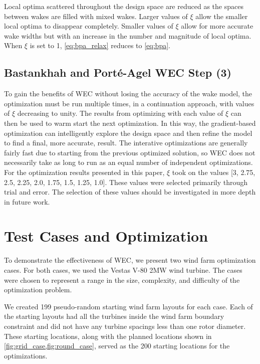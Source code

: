 \documentclass[a4paper]{jpconf}
\begin{document}
Local optima scattered throughout the design space are reduced as the spaces between wakes are filled with mixed wakes. Larger values of $\xi$ allow the smaller local optima to disappear completely. Smaller values of $\xi$ allow for more accurate wake widths but with an increase in the number and magnitude of local optima. When $\xi$ is set to 1, \cref{eq:bpa_relax} reduces to \cref{eq:bpa}.

\subsection{Bastankhah and Port\'e-Agel WEC Step (3)}
To gain the benefits of WEC without losing the accuracy of the wake model, the optimization must be run multiple times, in a continuation approach, with values of $\xi$ decreasing to unity. The results from optimizing with each value of $\xi$ can then be used to warm start the next optimization. In this way, the gradient-based optimization can intelligently explore the design space and then refine the model to find a final, more accurate, result. The interative optimizations are generally fairly fast due to starting from the previous optimized solution, so WEC does not necessarily take as long to run as an equal number of independent optimizations. For the optimization results presented in this paper, $\xi$ took on the values [3, 2.75, 2.5, 2.25, 2.0, 1.75, 1.5, 1.25, 1.0]. These values were selected primarily through trial and error. The selection of these values should be investigated in more depth in future work.

\section{Test Cases and Optimization}
To demonstrate the effectiveness of WEC, we present two wind farm optimization cases. For both cases, we used the Vestas V-80 2MW wind turbine. The cases were chosen to represent a range in the size, complexity, and difficulty of the optimization problem.

We created 199 pseudo-random starting wind farm layouts for each case. Each of the starting layouts had all the turbines inside the wind farm boundary constraint and did not have any turbine spacings less than one rotor diameter. These starting locations, along with the planned locations shown in \cref{fig:grid_case,fig:round_case}, served as the 200 starting locations for the optimizations.
\end{document}
